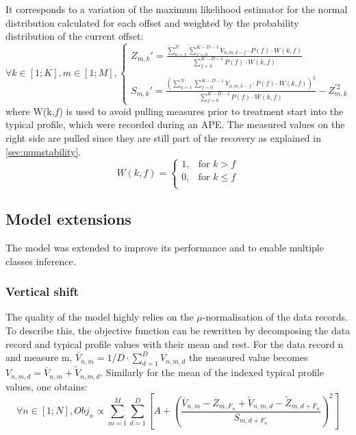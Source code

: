 It corresponds to a variation of the maximum likelihood estimator for the normal distribution calculated for each offset and weighted by the probability distribution of the current offset:
\begin{equation}
    \forall k \in [1;K], m \in [1;M],
    \begin{cases}
        Z_{m,k}' = \frac{ \sum_{n=1}^N \sum_{f=0}^{K-D-1} V_{n,m,k-f} \cdot P(f) \cdot W(k,f) }{ \sum_{f=0}^{K-D-1} P(f)\cdot W(k,f) }\\\\
        S_{m,k}' = \frac{\left( \sum_{n=1}^N \sum_{f=0}^{K-D-1} V_{n,m,k-f} \cdot P(f) \cdot W(k,f) \right)^2}{ \sum_{f=0}^{K-D-1} P(f)\cdot W(k,f) } - Z_{m,k}^{'2}
    \end{cases}
\end{equation}
where W(k,$f$) is used to avoid pulling measures prior to treatment start into the typical profile, which were recorded during an APE. The measured values on the right side are pulled since they are still part of the recovery as explained in \ref{sec:numstability}.
\begin{equation}
    W(k,f) = 
    \begin{cases}
        1, & \text{for } k > f\\
        0, & \text{for } k \leq f\\
    \end{cases}
\end{equation}

\subsection{Model extensions}
The model was extended to improve its performance and to enable multiple classes inference.

\subsubsection{Vertical shift} \label{sec:vshift}
The quality of the model highly relies on the $\mu$-normalisation of the data records. To describe this, the objective function can be rewritten by decomposing the data record and typical profile values with their mean and rest. For the data record n and measure m, $ \overline{V}_{n,m} = 1/D \cdot \sum_{d=1}^D V_{n,m,d} $ the measured value becomes $ V_{n,m,d} = \overline{V}_{n,m} + \widetilde{V}_{n,m,d}$. Similarly for the mean of the indexed typical profile values, one obtains:
\begin{equation}
    \forall n \in [1;N], Obj_n \propto \sum_{m=1}^M \sum_{d=1}^D \left[ A + \left( \frac{\overline{V}_{n,m} - \overline{Z}_{m,F_n} + \widetilde{V}_{n,m,d} - \widetilde{Z}_{m,d+F_n}}{ S_{m,d+F_n} } \right)^2 \right]
\end{equation}

